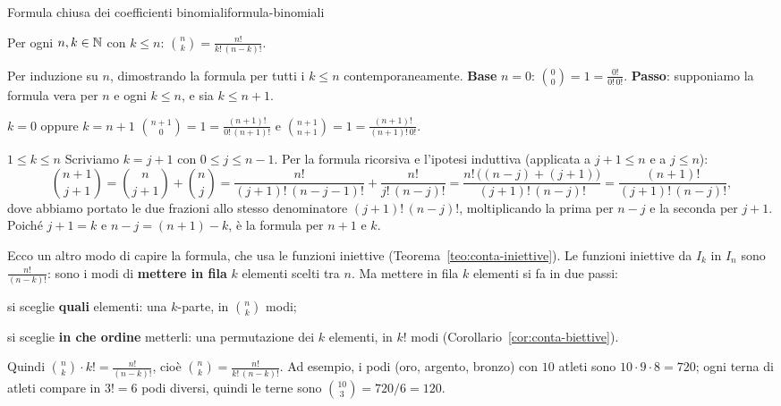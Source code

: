 \begin{concetto}
\begin{Teorema}{Formula chiusa dei coefficienti binomiali}{formula-binomiali}
    \begin{prerequisiti}
    \end{prerequisiti}
    Per ogni $n, k \in \mathbb{N}$ con $k \leq n$: \quad $\displaystyle\binom{n}{k} = \frac{n!}{k!\,(n - k)!}$.
\end{Teorema}
\begin{dimostrazione}
    Per induzione su $n$, dimostrando la formula per tutti i $k \leq n$ contemporaneamente.
    \textbf{Base} $n = 0$: $\binom{0}{0} = 1 = \frac{0!}{0!\,0!}$. \textbf{Passo}: supponiamo la formula vera per $n$ e ogni $k \leq n$, e sia $k \leq n + 1$.
    \begin{caso}{$k = 0$ oppure $k = n + 1$}
        $\binom{n + 1}{0} = 1 = \frac{(n + 1)!}{0!\,(n + 1)!}$ e $\binom{n + 1}{n + 1} = 1 = \frac{(n + 1)!}{(n + 1)!\,0!}$.
    \end{caso}
    \begin{caso}{$1 \leq k \leq n$}
        Scriviamo $k = j + 1$ con $0 \leq j \leq n - 1$. Per la formula ricorsiva e l'ipotesi induttiva (applicata a $j + 1 \leq n$ e a $j \leq n$):
        \[ \binom{n + 1}{j + 1} = \binom{n}{j + 1} + \binom{n}{j} = \frac{n!}{(j + 1)!\,(n - j - 1)!} + \frac{n!}{j!\,(n - j)!}
           = \frac{n!\,\big((n - j) + (j + 1)\big)}{(j + 1)!\,(n - j)!} = \frac{(n + 1)!}{(j + 1)!\,(n - j)!}, \]
        dove abbiamo portato le due frazioni allo stesso denominatore $(j + 1)!\,(n - j)!$, moltiplicando la prima per $n - j$ e la
        seconda per $j + 1$. Poiché $j + 1 = k$ e $n - j = (n + 1) - k$, è la formula per $n + 1$ e $k$.
    \end{caso}
\end{dimostrazione}
\end{concetto}

\begin{spiegazione}
    Ecco un altro modo di capire la formula, che usa le funzioni iniettive (Teorema~\ref{teo:conta-iniettive}). Le funzioni iniettive
    da $I_k$ in $I_n$ sono $\frac{n!}{(n - k)!}$: sono i modi di \textbf{mettere in fila} $k$ elementi scelti tra $n$. Ma mettere in fila $k$
    elementi si fa in due passi:
    \begin{passi}
        \item si sceglie \textbf{quali} elementi: una $k$-parte, in $\binom{n}{k}$ modi;
        \item si sceglie \textbf{in che ordine} metterli: una permutazione dei $k$ elementi, in $k!$ modi (Corollario~\ref{cor:conta-biettive}).
    \end{passi}
    Quindi $\binom{n}{k} \cdot k! = \frac{n!}{(n - k)!}$, cioè $\binom{n}{k} = \frac{n!}{k!\,(n - k)!}$. Ad esempio, i podi (oro, argento, bronzo) con
    $10$ atleti sono $10 \cdot 9 \cdot 8 = 720$; ogni terna di atleti compare in $3! = 6$ podi diversi, quindi le terne sono $\binom{10}{3} = 720 / 6 = 120$.
\end{spiegazione}

